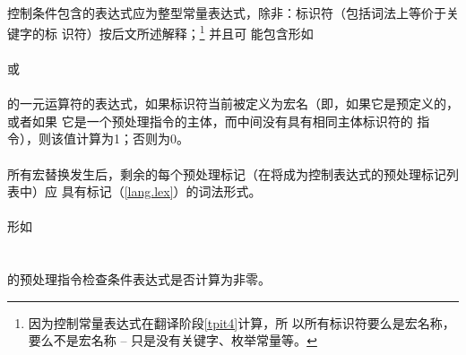 {\paragraph{}
控制条件包含的表达式应为整型常量表达式，除非：标识符（包括词法上等价于关键字的标
识符）按后文所述解释；\footnote{因为控制常量表达式在翻译阶段\ref{tpit4}计算，所
以所有标识符要么是宏名称，要么不是宏名称 -- 只是没有关键字、枚举常量等。} 并且可
能包含形如                                                                    \\
\mbox{\hspace{4em} }                               \\
或                                                                            \\
\mbox{\hspace{4em}  \tm{)}}                      \\
的一元运算符的表达式，如果标识符当前被定义为宏名（即，如果它是预定义的，或者如果
它是一个预处理指令的主体，而中间没有具有相同主体标识符的
指令），则该值计算为1；否则为0。

\paragraph{}
所有宏替换发生后，剩余的每个预处理标记（在将成为控制表达式的预处理标记列表中）应
具有标记（\ref{lang.lex}）的词法形式。

\semantic
\paragraph{}
形如                                                                          \\
\mbox{\hspace{4em} }                                                           \\
\mbox{\hspace{4em} }                                                           \\
的预处理指令检查条件表达式是否计算为非零。

}
